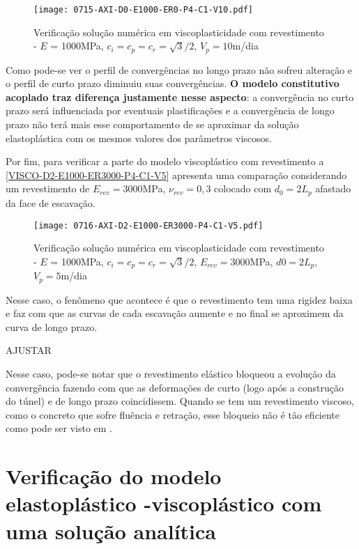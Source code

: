 \begin{figure}[H]
	\begin{center}
		\texttt{[image: 0715-AXI-D0-E1000-ER0-P4-C1-V10.pdf]}
	\end{center}
	\caption{\label{VISCO-D0-E1000-ER0-P4-C1-V10}Verificação solução numérica em viscoplasticidade com revestimento - $E$ = 1000MPa, $c_i=c_p=c_r=\sqrt{3}/2$, $V_p=10$m/dia}
\end{figure}
Como pode-se ver o perfil de convergências no longo prazo não sofreu alteração e o perfil de curto prazo diminuiu suas convergências. \textbf{O modelo constitutivo acoplado traz diferença justamente nesse aspecto}: a convergência no curto prazo será influenciada por eventuais plastificações e a convergência de longo prazo não terá mais esse comportamento de se aproximar da solução elastoplástica com os mesmos valores dos parâmetros viscosos.

Por fim, para verificar a parte do modelo viscoplástico com revestimento a \autoref{VISCO-D2-E1000-ER3000-P4-C1-V5} apresenta uma comparação considerando um revestimento de $E_{rev}=3000$MPa, $\nu_{rev}=0,3$ colocado com $d_0=2L_p$ afastado da face de escavação.

\begin{figure}[H]
	\begin{center}
		\texttt{[image: 0716-AXI-D2-E1000-ER3000-P4-C1-V5.pdf]}
	\end{center}
	\caption{\label{VISCO-D2-E1000-ER3000-P4-C1-V5}Verificação solução numérica em viscoplasticidade com revestimento - $E$ = 1000MPa, $c_i=c_p=c_r=\sqrt{3}/2$, $E_{rev} = 3000$MPa, $d0=2L_p$, $V_p=5$m/dia}
\end{figure}
Nesse caso, o fenômeno que acontece é que o revestimento tem uma rigidez baixa e faz com que as curvas de cada escavação aumente e no final se aproximem da curva de longo prazo.

AJUSTAR

Nesse caso, pode-se notar que o revestimento elástico bloqueou a evolução da convergência fazendo com que as deformações de curto (logo após a construção do túnel) e de longo prazo coincidissem. Quando se tem um revestimento viscoso, como o concreto que sofre fluência e retração, esse bloqueio não é tão eficiente como pode ser visto em .


\section{Verificação do modelo elastoplástico -viscoplástico com uma solução analítica}

